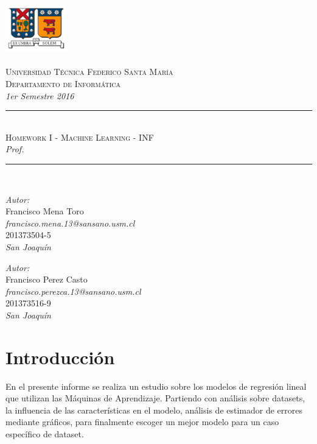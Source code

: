 \documentclass[10pt]{article}
\newcommand{\HRule}{\rule{\linewidth}{0.25mm}}
\begin{document}
\begin{center}
\includegraphics[width=0.2\textwidth]{images/logo_usm}~\\[1.2cm]
~\\[-1.5cm]

\textsc{\large Universidad T\'ecnica Federico Santa Mar\'ia}\\[0.2cm]
\textsc{\large Departamento de Inform\'atica}\\[0.2cm]
\textit{1er Semestre 2016}\\[4cm]

\HRule \\[0.6cm]
{\Large \textsc{Homework I - Machine Learning - INF}}\\[0.4cm]
{\Large \textit{Prof. }}\\[0.1cm]
\HRule \\[0.8cm]

\begin{minipage}{0.4\textwidth}
\begin{center}
\emph{Autor:}\\
Francisco Mena Toro\\ \textit{francisco.mena.13@sansano.usm.cl} \\ 201373504-5 \\
\emph{San Joaqu\'in}
\end{center}
\end{minipage}
\begin{minipage}{0.4\textwidth}
\begin{center}
\emph{Autor:}\\
Francisco Perez Casto\\ \textit{francisco.perezca.13@sansano.usm.cl} \\ 201373516-9 \\
\emph{San Joaqu\'in}
\end{center}
\end{minipage}
\end{center}

\vspace{2cm}

\newpage


\section*{Introducción}
En el presente informe se realiza un estudio sobre los modelos de regresión lineal que utilizan las Máquinas de Aprendizaje. Partiendo con análisis sobre datasets, la influencia de las características en el modelo, análisis de estimador de errores mediante gráficos, para finalmente escoger un mejor modelo para un caso específico de dataset. \\
\end{document}
